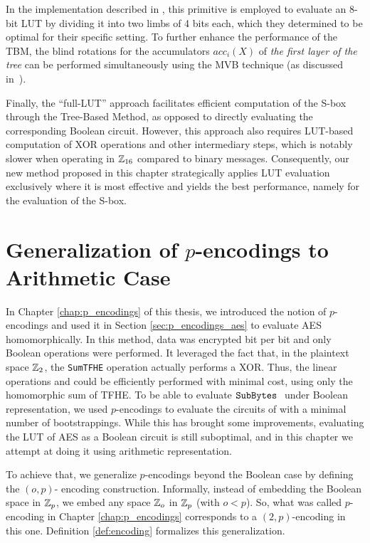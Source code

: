 In the implementation described in \cite{DBLP:conf/wahc/TramaCBS23}, this primitive is employed to evaluate an 8-bit LUT by dividing it into two limbs of 4 bits each, which they determined to be optimal for their specific setting. 
%
To further enhance the performance of the TBM, the blind rotations for the accumulators $acc_i(X)$ of \emph{the first layer of the tree} can be performed simultaneously using the MVB technique (as discussed in~\cite{TCHES:GuiBorAra21}). 

Finally, the ``full-LUT'' approach facilitates efficient computation of the S-box through the Tree-Based Method, as opposed to directly evaluating the corresponding Boolean circuit. However, this approach also requires LUT-based computation of XOR operations and other intermediary steps, which is notably slower when operating in $\mathbb{Z}_{16}$ compared to binary messages. Consequently, our new method \hippo{} proposed in this chapter strategically applies LUT evaluation exclusively where it is most effective and yields the best performance, namely for the evaluation of the S-box.




\section{Generalization of $p$-encodings to Arithmetic Case}
\label{sec:generalization_p_encodings}

In Chapter \ref{chap:p_encodings} of this thesis, we introduced the notion of $p$-encodings and used it in Section \ref{sec:p_encodings_aes} to evaluate AES homomorphically. In this method, data was encrypted bit per bit and only Boolean operations were performed. It leveraged the fact that, in the plaintext space $\mathbb{Z}_2$, the \texttt{SumTFHE} operation actually performs a XOR. Thus, the linear operations \MixColumns and \AddRoundKey could be efficiently performed with minimal cost, using only the homomorphic sum of TFHE. To be able to evaluate $\texttt{SubBytes}~$ under Boolean representation, we used $p$-encodings to evaluate the circuits of \SubBytes with a minimal number of bootstrappings. While this has brought some improvements, evaluating the LUT of AES as a Boolean circuit is still suboptimal, and in this chapter we attempt at doing it using arithmetic representation.

To achieve that, we generalize $p$-encodings beyond the Boolean case by defining the $(o, p)$- encoding construction. Informally, instead of embedding the Boolean space in $\mathbb{Z}_p$, we embed any space $\mathbb{Z}_o$ in $\mathbb{Z}_p$ (with $o < p$). So, what was called $p$-encoding in Chapter \ref{chap:p_encodings} corresponds to a $(2, p)$-encoding in this one.
%
Definition \ref{def:encoding} formalizes this generalization.

